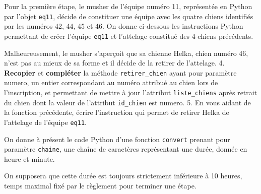 Pour la première étape, le musher de l'équipe numéro 11, représentée en
Python par l'objet \texttt{eq11}, décide de constituer une équipe avec
les quatre chiens identifiés par les numéros 42, 44, 45 et 46. On donne
ci-dessous les instructions Python permettant de créer l'équipe
\texttt{eq11} et l'attelage constitué des 4 chiens précédents.

\begin{Shaded}
\begin{Highlighting}[]
\OperatorTok{=}\NormalTok{, }\NormalTok{)}
\end{Highlighting}
\end{Shaded}

Malheureusement, le musher s'aperçoit que sa chienne Helka, chien numéro
46, n'est pas au mieux de sa forme et il décide de la retirer de
l'attelage. 4. \textbf{Recopier} et \textbf{compléter} la méthode
\texttt{retirer\_chien} ayant pour paramètre numero, un entier
correspondant au numéro attribué au chien lors de l'inscription, et
permettant de mettre à jour l'attribut \texttt{liste\_chiens} après
retrait du chien dont la valeur de l'attribut \texttt{id\_chien} est
numero. 5. En vous aidant de la fonction précédente, écrire
l'instruction qui permet de retirer Helka de l'attelage de l'équipe
\texttt{eq11}.

On donne à présent le code Python d'une fonction \texttt{convert}
prenant pour paramètre \texttt{chaine}, une chaîne de caractères
représentant une durée, donnée en heure et minute.

On supposera que cette durée est toujours strictement inférieure à 10
heures, temps maximal fixé par le règlement pour terminer une étape.

\begin{Shaded}
\begin{Highlighting}[]
 
\OperatorTok{=} \NormalTok{(chaine[}\NormalTok{]) }\OperatorTok{+} \NormalTok{(chaine[}\NormalTok{] }\OperatorTok{+}\NormalTok{ chaine[}\NormalTok{])}\OperatorTok{/}
       
\end{Highlighting}
\end{Shaded}

